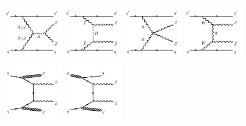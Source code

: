 \begin{figure}[!htbp]
\begin{center}
\includegraphics[width=0.22\textwidth]{figures/diagram/diagram-EWZZjj-Schn-Higgs.pdf}
\includegraphics[width=0.22\textwidth]{figures/diagram/diagram-EWZZjj-Tchn-Higgs.pdf}
\includegraphics[width=0.22\textwidth]{figures/diagram/diagram-EWZZjj-QGC.pdf}
\includegraphics[width=0.22\textwidth]{figures/diagram/diagram-EWZZjj-TGC.pdf}\\
\includegraphics[width=0.22\textwidth]{figures/diagram/diagram-QCDZZjj-qq.pdf}
\includegraphics[width=0.22\textwidth]{figures/diagram/diagram-QCDZZjj-qg.pdf}

\end{center}
\end{figure}
